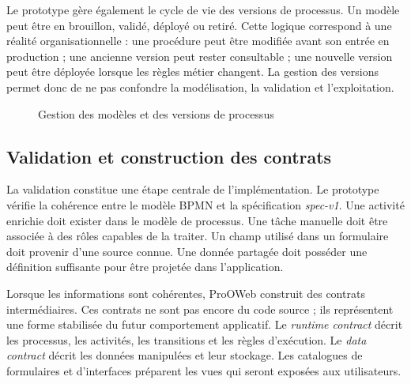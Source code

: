 Le prototype gère également le cycle de vie des versions de processus. Un modèle peut être en brouillon, validé, déployé ou retiré. Cette logique correspond à une réalité organisationnelle : une procédure peut être modifiée avant son entrée en production ; une ancienne version peut rester consultable ; une nouvelle version peut être déployée lorsque les règles métier changent. La gestion des versions permet donc de ne pas confondre la modélisation, la validation et l'exploitation.

\begin{figure}[H]
\centering
{}
\caption{Gestion des modèles et des versions de processus}
\label{fig:chap4-gestion-modeles-processus}
\end{figure}

\subsection{Validation et construction des contrats}

La validation constitue une étape centrale de l'implémentation. Le prototype vérifie la cohérence entre le modèle BPMN et la spécification \textit{spec-v1}. Une activité enrichie doit exister dans le modèle de processus. Une tâche manuelle doit être associée à des rôles capables de la traiter. Un champ utilisé dans un formulaire doit provenir d'une source connue. Une donnée partagée doit posséder une définition suffisante pour être projetée dans l'application.

Lorsque les informations sont cohérentes, ProOWeb construit des contrats intermédiaires. Ces contrats ne sont pas encore du code source ; ils représentent une forme stabilisée du futur comportement applicatif. Le \textit{runtime contract} décrit les processus, les activités, les transitions et les règles d'exécution. Le \textit{data contract} décrit les données manipulées et leur stockage. Les catalogues de formulaires et d'interfaces préparent les vues qui seront exposées aux utilisateurs.


